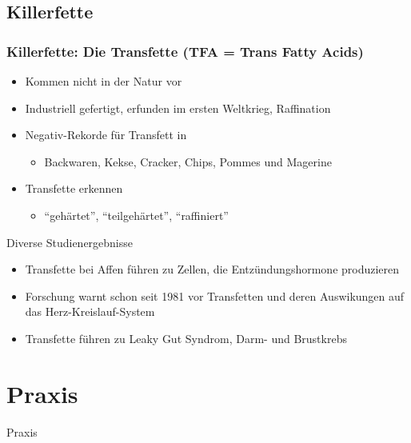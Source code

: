 \documentclass[xcolor=dvipsnames]{beamer}
\begin{document}
    \subsection{Killerfette}
    \begin{frame}[allowframebreaks]
        \frametitle{Killerfette: Die Transfette (TFA = Trans Fatty Acids)}

        \begin{itemize}
            \setlength\itemsep{1em}
            \item Kommen nicht in der Natur vor
            \item Industriell gefertigt, erfunden im ersten Weltkrieg, Raffination
            \item Negativ-Rekorde für Transfett in
            \begin{itemize}
                \setlength\itemsep{1em}
                \item Backwaren, Kekse, Cracker, Chips, Pommes und Magerine
            \end{itemize}
            \item Transfette erkennen
            \begin{itemize}
                \setlength\itemsep{1em}
                \item "`gehärtet"', "`teilgehärtet"', "`raffiniert"'
            \end{itemize}
        \end{itemize}

        \framebreak

        \begin{block}{Diverse Studienergebnisse}
            \begin{itemize}
                \setlength\itemsep{1em}
                \item Transfette bei Affen führen zu Zellen, die Entzündungshormone produzieren
                \item Forschung warnt schon seit 1981 vor Transfetten und deren Auswikungen auf das Herz-Kreislauf-System
                \item Transfette führen zu Leaky Gut Syndrom, Darm- und Brustkrebs
            \end{itemize}
        \end{block}
    \end{frame}

    \section{Praxis}
    {
        \begin{frame}
            \begin{center}
                \Huge Praxis
            \end{center}
        \end{frame}
    }
\end{document}
